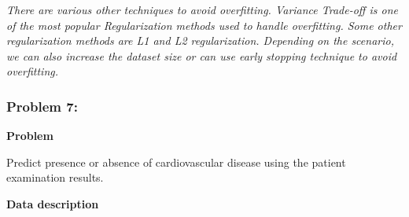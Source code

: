 \documentclass[11pt]{article}
\begin{document}
\emph{There are various other techniques to avoid overfitting. Variance
Trade-off is one of the most popular Regularization methods used to
handle overfitting. Some other regularization methods are L1 and L2
regularization. Depending on the scenario, we can also increase the
dataset size or can use early stopping technique to avoid overfitting.}

    \subsubsection{Problem 7:}\label{problem-7}

\textbf{Problem}

Predict presence or absence of cardiovascular disease using the patient
examination results.

\textbf{Data description}
\end{document}

